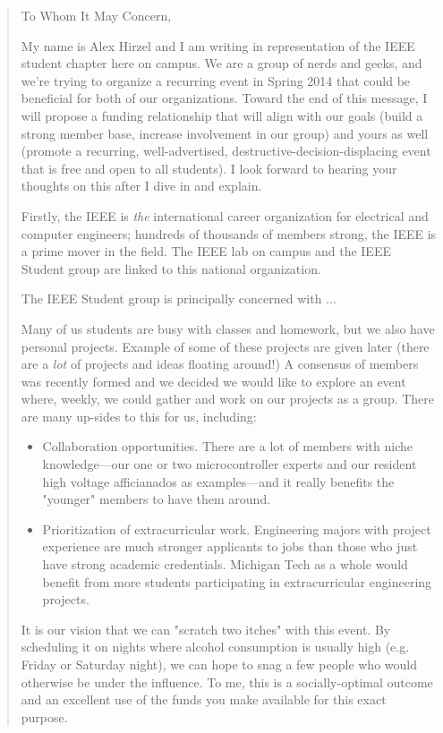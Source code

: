 \documentclass[article]{memoir}
\newcommand{\bi}[0]{\begin{itemize}}
\newcommand{\ei}[0]{\end{itemize}}
\begin{document}
\begin{quotation}
To Whom It May Concern,

My name is Alex Hirzel and I am writing in representation of the IEEE student
chapter here on campus. We are a group of nerds and geeks, and we're trying to
organize a recurring event in Spring 2014 that could be beneficial for both of
our organizations. Toward the end of this message, I will propose a funding
relationship that will align with our goals (build a strong member base,
increase involvement in our group) and yours as well (promote a recurring,
well-advertised, destructive-decision-displacing event that is free and open to
all students). I look forward to hearing your thoughts on this after I dive in
and explain.

Firstly, the IEEE is \emph{the} international career organization for electrical
and computer engineers; hundreds of thousands of members strong, the IEEE is a
prime mover in the field. The IEEE lab on campus and the IEEE Student group are
linked to this national organization.

The IEEE Student group is principally concerned with ...

Many of us students are busy with classes and homework, but we also have
personal projects. Example of some of these projects are given later (there are
a \emph{lot} of projects and ideas floating around!) A consensus of members was
recently formed and we decided we would like to explore an event where, weekly,
we could gather and work on our projects as a group. There are many up-sides to
this for us, including:

\bi
\item Collaboration opportunities. There are a lot of members with niche
knowledge---our one or two microcontroller experts and our resident high voltage
afficianados as examples---and it really benefits the "younger" members to have
them around.
\item Prioritization of extracurricular work. Engineering majors with project
experience are much stronger applicants to jobs than those who just have strong
academic credentials. Michigan Tech as a whole would benefit from more students
participating in extracurricular engineering projects.
\ei

It is our vision that we can "scratch two itches" with this event. By scheduling
it on nights where alcohol consumption is usually high (e.g. Friday or Saturday
night), we can hope to snag a few people who would otherwise be under the
influence. To me, this is a socially-optimal outcome and an excellent use of
the funds you make available for this exact purpose.


\end{quotation}
\end{document}

